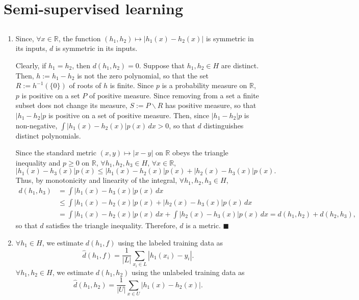 \documentclass[11pt]{article}
\renewcommand{\qed}{\quad $\blacksquare$}
\newcommand{\inv}{^{-1}}
\newcommand{\R}{\mathbb{R}} %
\newcommand{\sminus}{\backslash} %
\begin{document}
\section{Semi-supervised learning}
\subsection{}
\begin{enumerate}[1.]
\item Since, $\forall x \in \R$, the function
$(h_1,h_2) \mapsto |h_1(x) - h_2(x)|$ is symmetric in its inputs, $d$ is
symmetric in its inputs.

Clearly, if $h_1 = h_2$, then $d(h_1,h_2) = 0$. Suppose that $h_1,h_2 \in H$
are distinct. Then, $h := h_1 - h_2$ is not the zero polynomial, so that the
set $R := h\inv(\{0\})$ of roots of $h$ is finite. Since $p$ is a probability
measure on $\R$, $p$ is positive on a set $P$ of positive measure. Since
removing from a set a finite subset does not change its measure,
$S := P \sminus R$ has positive measure, so that $|h_1 - h_2| p$ is
positive on a set of positive measure. Then, since $|h_1 - h_2| p$ is
non-negative, $\int |h_1(x) - h_2(x)| p(x) \, dx > 0$, so that $d$
distinguishes distinct polynomials.

Since the standard metric $(x,y) \mapsto |x - y|$ on $\R$ obeys the triangle
inequality and $p \geq 0$ on $\R$,
$\forall h_1,h_2,h_3 \in H$, $\forall x \in \R$,
\[|h_1(x) - h_3(x)| p(x)
 \leq |h_1(x) - h_2(x)|p(x) + |h_2(x) - h_3(x)| p(x).
\]
Thus, by monotonicity and linearity of the integral,
$\forall h_1,h_2,h_3 \in H$,
\begin{align*}
d(h_1,h_3)
 & =    \int        |h_1(x) - h_3(x)| p(x) \, dx                            \\
 & \leq \int |h_1(x) - h_2(x)| p(x) + |h_2(x) - h_3(x)| p(x) \, dx          \\
 & =    \int |h_1(x) - h_2(x)| p(x) \, dx + \int |h_2(x) - h_3(x)| p(x) \, dx
   =    d(h_1,h_2) + d(h_2,h_3),
\end{align*}
so that $d$ satisfies the triangle inequality. Therefore, $d$ is a metric.
\qed

\item $\forall h_1 \in H$, we estimate $d(h_1,f)$ using the labeled training
data as
\[\hat{d}(h_1,f) = \frac{1}{|L|} \sum_{x_i \in L} |h_1(x_i) - y_i|.\]
$\forall h_1,h_2 \in H$, we estimate $d(h_1,h_2)$ using the unlabeled training
data as
\[\hat{d}(h_1,h_2) = \frac{1}{|U|} \sum_{x \in U} |h_1(x) - h_2(x)|.\]

\end{enumerate}
\end{document}
